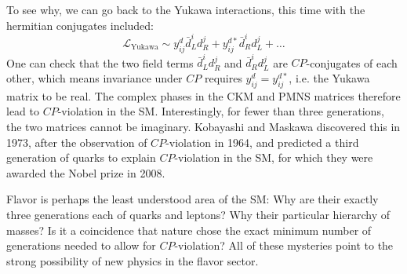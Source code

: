 To see why, we can go back to the Yukawa interactions, this time with the hermitian conjugates included:
\begin{equation}
	\label{eq:01_sm_ew_yukawa_hermitian}
	\mathcal{L}_\mathrm{Yukawa} \sim y^d_{ij} \bar d^i_L d^j_R + y^{d*}_{ij} \bar d^i_R d^j_L + \ldots
\end{equation}
One can check that the two field terms $\bar d^i_L d^j_R$ and $\bar d^i_R d^j_L$ are $CP$-conjugates of each other, which means invariance under $CP$ requires $y^d_{ij} = y^{d*}_{ij}$, i.e. the Yukawa matrix to be real.
The complex phases in the CKM and PMNS matrices therefore lead to $CP$-violation in the SM.
Interestingly, for fewer than three generations, the two matrices cannot be imaginary.
Kobayashi and Maskawa discovered this in 1973, after the observation of $CP$-violation in 1964, and predicted a third generation of quarks to explain $CP$-violation in the SM, for which they were awarded the Nobel prize in 2008.

Flavor is perhaps the least understood area of the SM:
Why are their exactly three generations each of quarks and leptons? 
Why their particular hierarchy of masses?
Is it a coincidence that nature chose the exact minimum number of generations needed to allow for $CP$-violation?
All of these mysteries point to the strong possibility of new physics in the flavor sector.





